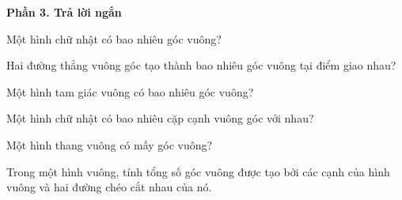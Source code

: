 \textbf{Phần 3. Trả lời ngắn}

\begin{ex} %
Một hình chữ nhật có bao nhiêu góc vuông?
\end{ex}

\begin{ex} %
Hai đường thẳng vuông góc tạo thành bao nhiêu góc vuông tại điểm giao nhau?
\end{ex}

\begin{ex} %
Một hình tam giác vuông có bao nhiêu góc vuông?
\end{ex}

\begin{ex} %
Một hình chữ nhật có bao nhiêu cặp cạnh vuông góc với nhau?
\end{ex}

\begin{ex} %
Một hình thang vuông có mấy góc vuông?
\end{ex}

\begin{ex} %
Trong một hình vuông, tính tổng số góc vuông được tạo bởi các cạnh của hình vuông và hai đường chéo cắt nhau của nó.
\end{ex}
